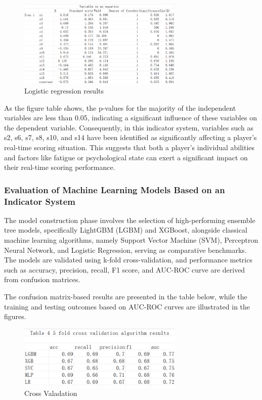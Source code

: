 \documentclass{article}
\begin{document}
\begin{figure}[H]
      \centering
      \includegraphics[width=0.7\textwidth]{variable_eq1.png}
      \caption{Logistic regression results}
\end{figure}
As the figure table shows, the p-values for the majority of the independent variables are less than 0.05, indicating a significant influence of these variables on the dependent variable. Consequently, in this indicator system,
variables such as s2, s6, s7, s8, s10, and s14 have been identified as significantly affecting a player's real-time scoring situation.
This suggests that both a player's individual abilities and factors like fatigue or psychological state can exert a significant impact on their real-time scoring performance.

\subsubsection{Evaluation of Machine Learning Models Based on an Indicator System}
The model construction phase involves the selection of high-performing ensemble tree models, specifically LightGBM (LGBM) and XGBoost, alongside classical machine learning algorithms,
namely Support Vector Machine (SVM), Perceptron Neural Network, and Logistic Regression, serving as comparative benchmarks. The models are validated using k-fold cross-validation,
and performance metrics such as accuracy, precision, recall, F1 score, and AUC-ROC curve are derived from confusion matrices.

The confusion matrix-based results are presented in the table below, while the training and testing outcomes based on AUC-ROC curves are illustrated in the figures.
\begin{figure}[H]
      \centering
      \includegraphics[width=0.7\textwidth]{cross_valadation.png}
      \caption{Cross Valadation}
\end{figure}
\end{document}
